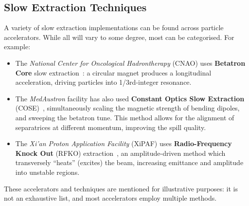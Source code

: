 \documentclass[11pt]{report}
\begin{document}
\subsection{Slow Extraction Techniques}


A variety of slow extraction implementations can be found across particle accelerators. While all will vary to some degree, most can be categorised. For example:
\begin{itemize}
  \item The \textit{National Center for Oncological Hadrontherapy} (CNAO) uses \textbf{Betatron Core} slow extraction~\cite{Falbo:IPAC2018-TUZGBF3}: a circular magnet produces a longitudinal acceleration, driving particles into 1/3rd-integer resonance.
  \item The \textit{MedAustron} facility has also used \textbf{Constant Optics Slow Extraction} (COSE)~\cite{ArrutiaSota:2845862}, simultaneously scaling the magnetic strength of bending dipoles, and sweeping the betatron tune. This method allows for the alignment of separatrices at different momentum, improving the spill quality.
  \item The \textit{Xi’an Proton Application Facility} (XiPAF) uses \textbf{Radio-Frequency Knock Out} (RFKO) extraction~\cite{Yao:2016cnf}, an amplitude-driven method which transversely ``heats'' (excites) the beam, increasing emittance and amplitude into unstable regions.
\end{itemize}
These accelerators and techniques are mentioned for illustrative purposes: it is not an exhaustive list, and most accelerators employ multiple methods.


\end{document}

